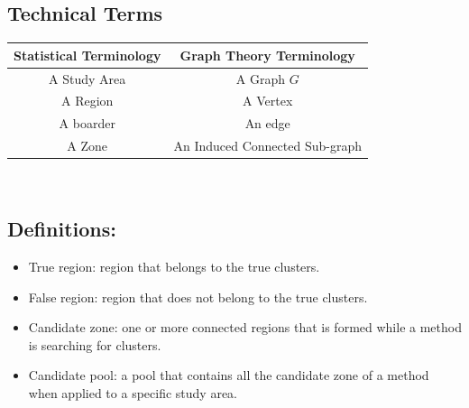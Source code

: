 \documentclass[12pt]{article}
\begin{document}
\subsection{Technical Terms}
\begin{tabular}{|c|c|}
\hline
\textbf{Statistical Terminology }& \textbf{Graph Theory Terminology} \\
\hline
A Study Area & A Graph $G$ \\
A Region & A Vertex \\
A boarder & An edge \\
A Zone & An Induced Connected Sub-graph\\

\hline

\end{tabular} \\

 	
\subsection{Definitions:} 
\begin{itemize}
\item True region:  region that belongs to the true clusters. \\ 
\item False region:  region that does not belong to the true clusters. \\ 
\item Candidate zone:  one or more connected regions that is formed while a method is searching for clusters.\\ 
\item Candidate pool:  a pool that contains all the candidate zone of a method when applied to a specific study area. \\
\end{itemize}
\end{document}
